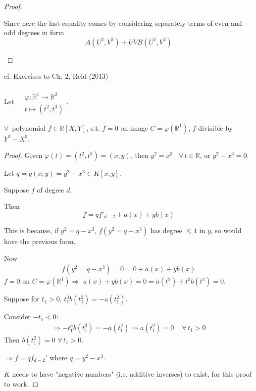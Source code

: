 \documentclass[10pt]{amsart}
\newcommand{\exercisehead}[1]
  { \smallskip
   \noindent{\small\bf Exercise #1.}
  }
\begin{document}
\begin{multicols*}{2}
\begin{proof}
\begin{enumerate}
	Since here the last equality comes by considering separately terms of even and odd degrees in form 
	\[
	A(U^2, V^2)  + UVB(U^2, V^2)
	\]
	
\end{enumerate}	
\end{proof}

cf. Exercises to Ch. 2, Reid (2013)

\exercisehead{2.2}
Let $\begin{aligned} & \quad \\ 
& \varphi : \mathbb{R}^1 \to \mathbb{R}^2	\\
& t \mapsto (t^2, t^3) \end{aligned}$. 

$\forall \, $ polynomial $f \in \mathbb{R}[X, Y]$, s.t. $f= 0$ on image $C = \varphi(\mathbb{R}^1)$, $f$ divisible by $Y^2 - X^3$. 

\begin{proof}
	Given $\varphi(t) = (t^2, t^3) = (x,y)$, then $y^2 = x^3$ \, $\forall \, t \in \mathbb{R}$, or $y^2 - x^3 = 0$.
	
	Let $q= q(x,y) = y^2 - x^3 \in K[x,y]$.
	
	Suppose $f$ of degree $d$.
	
	Then 
	\[
	f = q f'_{d-2} + a(x) + y b(x)
	\]
	
	This is because, if $y^2 = q- x^3$, $f(y^2 = q- x^3)$ has degree $\leq 1$ in $y$, so would have the previous form.
	
	Now 
	\[
	\begin{gathered}
	f(y^2 = q- x^3) = 0 = 0 + a(x) + yb(x)
	\end{gathered}
	\]
	$f = 0$ on $C = \varphi(\mathbb{R}^1) \Longrightarrow $ $a(x) + yb(x) =0 = a(t^2) + t^3 b(t^2) = 0$.
	
	Suppose for $t_1 > 0$, $t_1^3 b(t_1^2) = -a(t_1^2)$. 
	
	Consider $-t_1 < 0$: 
	\[
	\begin{gathered}
	\Longrightarrow -t_1^3 b(t_1^3) = -a(t_1^2) \Longrightarrow a(t_1^2) = 0 \quad \, \forall \, t_1 >0
	\end{gathered}
	\]
	Then $b(t_1^2) = 0$ $\forall \, t_1 > 0$.
	
	$\Longrightarrow f = qf_{d-2}'$ where $q = y^2-x^3$.
	
	$K$ needs to have "negative numbers" (i.e. additive inverses) to exist, for this proof to work.
	\end{proof}	



\end{multicols*}
\end{document}
